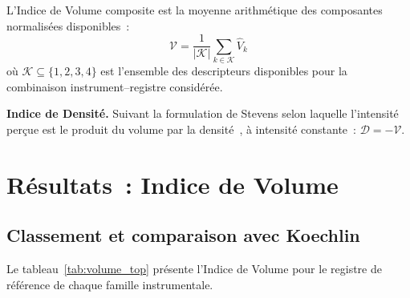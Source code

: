 \documentclass[journal]{IEEEtran}
\begin{document}
L'Indice de Volume composite est la moyenne arithmétique des composantes normalisées disponibles~:
\begin{equation}
\mathcal{V} = \frac{1}{|\mathcal{K}|} \sum_{k \in \mathcal{K}} \hat{V}_k
\end{equation}
où $\mathcal{K} \subseteq \{1,2,3,4\}$ est l'ensemble des descripteurs disponibles pour la combinaison instrument--registre considérée.

\textbf{Indice de Densité.} Suivant la formulation de Stevens selon laquelle l'intensité perçue est le produit du volume par la densité~\cite{Stevens1965}, à intensité constante~: $\mathcal{D} = -\mathcal{V}$.

\section{Résultats~: Indice de Volume}
\label{sec:volume}

\subsection{Classement et comparaison avec Koechlin}

Le tableau~\ref{tab:volume_top} présente l'Indice de Volume pour le registre de référence de chaque famille instrumentale.
\end{document}
